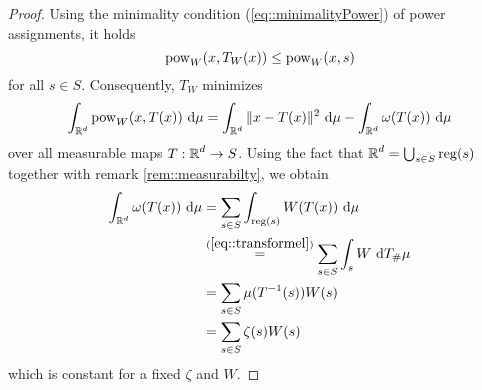 \documentclass[
     12pt,         %
     a4paper,      %
     BCOR=10mm,     %
     DIV=14,        %
     ]{scrreprt}
\begin{document}
    \begin{proof}[Proof]
        Using the minimality condition (\ref{eq::minimalityPower}) of power assignments, it holds \[\operatorname{pow}_W(x,T_W(x)) \le \operatorname{pow}_W(x,s) \] for all $s\in S$. 
        Consequently, $T_W$ minimizes 
        \[ \int_{\operatorname{\mathbb{R}}^d} \operatorname{pow}_W(x,T(x)) \ {\operatorname{{\mathrm{d}}}} \mu =  \int_{\operatorname{\mathbb{R}}^d} \| x - T(x) \|^2 \ {\operatorname{{\mathrm{d}}}} \mu - \int_{\operatorname{\mathbb{R}}^d} \omega(T(x)) \ {\operatorname{{\mathrm{d}}}} \mu \]
        over all measurable maps $T:\operatorname{\mathbb{R}}^d \to S$. Using the fact that $\operatorname{\mathbb{R}}^d = \bigcup_{s\in S} \operatorname{reg}(s)$ together with remark \ref{rem::measurabilty}, we obtain
        \begin{align*} 
            \int_{\operatorname{\mathbb{R}}^d} \omega(T(x)) \ {\operatorname{{\mathrm{d}}}} \mu &= \sum_{s\in S} \int_{\operatorname{reg}(s)} W(T(x)) \ {\operatorname{{\mathrm{d}}}} \mu \\ 
                                                 &\overset {(\ref{eq::transformel})}= \sum_{s\in S} \int_{s} W \ {\operatorname{{\mathrm{d}}}} T_{\#}\mu \\
                                                 &= \sum_{s\in S} \mu(T^{-1}(s))W(s) \\
                                                 &= \sum_{s\in S} \zeta(s)W(s) 
        \end{align*}
        which is constant for a fixed $\zeta$ and $W$.
    \end{proof}
\end{document}
